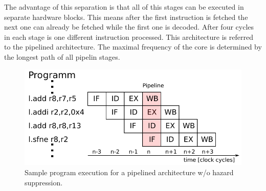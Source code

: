 The advantage of this separation is that all of this stages can be executed in separate hardware blocks. This means after the first instruction is fetched the next one can already be fetched while the first one is decoded. After four cycles in each stage is one different instruction processed. This architecture is referred to the pipelined architecture.\cite{ddca} The maximal frequency of the core is determined by the longest path of all pipelin stages.

\begin{figure}[htbp]
  \centering
  \includegraphics[scale=0.8]{./figures/pipeline}
  \caption{Sample program execution for a pipelined architecture w/o hazard suppression.}
  \label{fig:pipe1}
\end{figure}  


